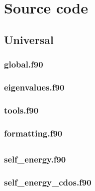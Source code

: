 
\def\path{../../ebmb}

\chapter{Source code}

\section{Universal}

\subsection{global.f90}



\subsection{eigenvalues.f90}



\subsection{tools.f90}



\subsection{formatting.f90}



\section{}

\subsection{self\_energy.f90}



\subsection{self\_energy\_cdos.f90}

